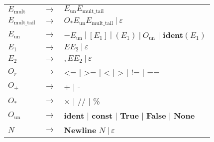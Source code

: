 \documentclass[a4paper, 12pt]{report}
\begin{document}
\begin{figure}[!h]
\begin{center}
{\begin{tabular}{lcl}
$E_\text{mult}$ & $\to$ & $E_\text{un}E_\text{mult\_tail}$\\
$E_\text{mult\_tail}$ & $\to$ & $O_* E_\text{un} E_\text{mult\_tail} \ | \ \varepsilon$\\
$E_\text{un}$ & $\to$ & $- E_\text{un} \ | \  [E_1] \ | \ (E_1) \ | \ O_\text{un}$ | \textbf{ident}$(E_1)$\\
$E_1$ & $\to$ & $E E_2 \ | \ \varepsilon$\\
$E_2$ & $\to$ & $, E E_2 \ | \ \varepsilon$\\
$O_r$ & $\to$ & <= | >= | < | > | != | ==\\
$O_+$ & $\to$ & + | -\\
$O_*$ & $\to$ & $\times$ | // | \%\\
$O_\text{un}$ & $\to$ &  \textbf{ident} | \textbf{const} | \textbf{True} | \textbf{False} | \textbf{None} \\
$N$ & $\to$ & \textbf{Newline} $N \ | \ \varepsilon$\\
\end{tabular}
}
\end{center}\end{figure}
\end{document}

